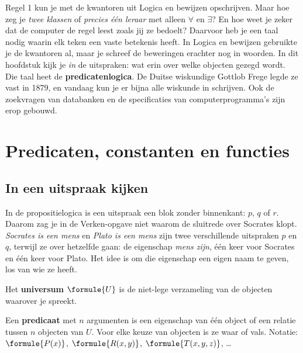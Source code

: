 Regel 1 kun je met de kwantoren uit Logica en bewijzen opschrijven. Maar hoe zeg je \textit{twee klassen} of \textit{precies één leraar} met alleen $\forall$ en $\exists$? En hoe weet je zeker dat de computer de regel leest zoals jij ze bedoelt? Daarvoor heb je een taal nodig waarin elk teken een vaste betekenis heeft. In Logica en bewijzen gebruikte je de kwantoren al, maar je schreef de beweringen erachter nog in woorden. In dit hoofdstuk kijk je \textit{in} de uitspraken: wat erin over welke objecten gezegd wordt. Die taal heet de \textbf{predicatenlogica}. De Duitse wiskundige Gottlob Frege legde ze vast in 1879, en vandaag kun je er bijna alle wiskunde in schrijven. Ook de zoekvragen van databanken en de specificaties van computerprogramma's zijn erop gebouwd.

\begin{oefeningen}[Start]

\end{oefeningen}


\section{Predicaten, constanten en functies}\label{sec:h1-predicaten}

\subsection{In een uitspraak kijken}

In de propositielogica is een uitspraak een blok zonder binnenkant: $p$, $q$ of $r$. Daarom zag je in de Verken-opgave niet waarom de sluitrede over Socrates klopt. \textit{Socrates is een mens} en \textit{Plato is een mens} zijn twee verschillende uitspraken $p$ en $q$, terwijl ze over hetzelfde gaan: de eigenschap \textit{mens zijn}, één keer voor Socrates en één keer voor Plato. Het idee is om die eigenschap een eigen naam te geven, los van wie ze heeft.

\begin{theorie}
Het \textbf{\textcolor{accent}{universum}} $\formule{U}$ is de niet-lege verzameling van de objecten waarover je spreekt.

\vspace{1mm}
Een \textbf{\textcolor{accent}{predicaat}} met $n$ argumenten is een eigenschap van één object of een relatie tussen $n$ objecten van $U$. Voor elke keuze van objecten is ze waar of vals. Notatie: $\formule{P(x)}$, $\formule{R(x, y)}$, $\formule{T(x, y, z)}$, \ldots
\end{theorie}

